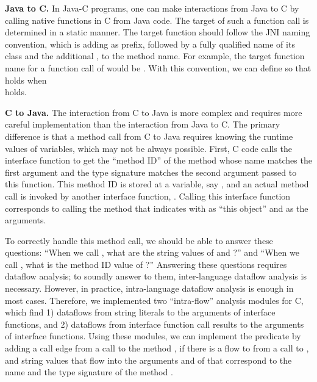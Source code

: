 \textbf{Java to C.} In Java-C programs, one can make interactions from Java to
C by calling native functions in C from Java code. 
The target of such a function call is determined in a static manner.
The target function should follow the JNI naming convention, which is adding
 as prefix, followed by a fully qualified name of its class and
the additional \codeql{\_}, to the method name.
For example, the target function name for a function call of 
would be .
With this convention, we can define  so that
 holds when  \\
 holds.


\medskip
\textbf{C to Java.} The interaction from C to Java is more complex and
requires more careful implementation than the interaction from Java to C.
The primary difference is that a method call from C to Java requires knowing
the runtime values of variables, which may not be always possible.
First, C code calls the interface function 
to get the ``method ID'' of the method whose name matches the first argument
and the type signature matches the second argument passed to this function.
This method ID is stored at a variable, say , and
an actual method call is invoked by another
interface function, . Calling this interface 
function corresponds to calling the method that  indicates
with  as ``this object'' and  as the arguments.

To correctly handle this method call, we should be able to answer these
questions: ``When we call ,
what are the string values of  and ?'' and
``When we call , what is the method ID value of ?''
Answering these questions requires dataflow analysis;
to soundly answer to them, inter-language dataflow analysis is necessary.
However, in practice, intra-language dataflow analysis is enough in most cases.
Therefore, we implemented two ``intra-flow'' analysis modules for C,
which find 1) dataflows from string literals to the arguments of interface functions,
and 2) dataflows from interface function call results to the arguments of interface functions.
Using these modules, we can implement the
predicate  by adding a call edge from a 
call to the method , if there is a flow to  from a
call to , and string values that flow into the
arguments  and  of  that
correspond to the name and the type signature of the method .

